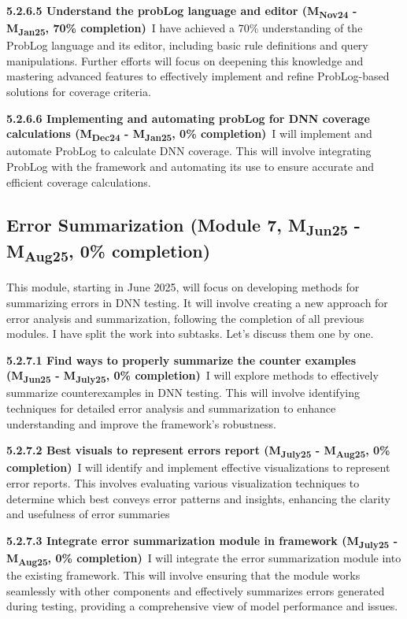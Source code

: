 \noindent \textbf{5.2.6.5 Understand the probLog language and editor (M\textsubscript{Nov24} - M\textsubscript{Jan25}, 70\% completion)}\ I have achieved a 70\% understanding of the ProbLog language and its editor, including basic rule definitions and query manipulations. Further efforts will focus on deepening this knowledge and mastering advanced features to effectively implement and refine ProbLog-based solutions for coverage criteria.


\noindent \textbf{5.2.6.6 Implementing and automating probLog for DNN coverage calculations (M\textsubscript{Dec24} - M\textsubscript{Jan25}, 0\% completion)}\ I will implement and automate ProbLog to calculate DNN coverage. This will involve integrating ProbLog with the framework and automating its use to ensure accurate and efficient coverage calculations.

\subsection{Error Summarization (Module 7, M\textsubscript{Jun25} - M\textsubscript{Aug25}, 0\% completion)}This module, starting in June 2025, will focus on developing methods for summarizing errors in DNN testing. It will involve creating a new approach for error analysis and summarization, following the completion of all previous modules. I have split the work into subtasks. Let's discuss them one by one.


\noindent \textbf{5.2.7.1 Find ways to properly summarize the counter examples (M\textsubscript{Jun25} - M\textsubscript{July25}, 0\% completion)}\ I will explore methods to effectively summarize counterexamples in DNN testing. This will involve identifying techniques for detailed error analysis and summarization to enhance understanding and improve the framework's robustness.

\noindent \textbf{5.2.7.2 Best visuals to represent errors report (M\textsubscript{July25} - M\textsubscript{Aug25}, 0\% completion)}\ I will identify and implement effective visualizations to represent error reports. This involves evaluating various visualization techniques to determine which best conveys error patterns and insights, enhancing the clarity and usefulness of error summaries

\noindent \textbf{5.2.7.3 Integrate error summarization module in framework (M\textsubscript{July25} - M\textsubscript{Aug25}, 0\% completion)}\ I will integrate the error summarization module into the existing framework. This will involve ensuring that the module works seamlessly with other components and effectively summarizes errors generated during testing, providing a comprehensive view of model performance and issues.

